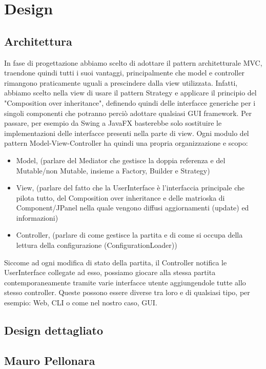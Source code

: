 \section{Design}
\subsection{Architettura}

In fase di progettazione abbiamo scelto di adottare il pattern architetturale MVC, traendone quindi tutti i suoi vantaggi, principalmente che model e controller rimangono praticamente uguali a prescindere dalla view utilizzata. Infatti, abbiamo scelto nella view di usare il pattern Strategy e applicare il principio del "Composition over inheritance", definendo quindi delle interfacce generiche per i singoli componenti che potranno perciò adottare qualsiasi GUI framework. Per passare, per esempio da Swing a JavaFX basterebbe solo sostituire le implementazioni delle interfacce presenti nella parte di view. Ogni modulo del pattern Model-View-Controller ha quindi una propria organizzazione e scopo:
\begin{itemize}
    \item Model, (parlare del Mediator che gestisce la doppia referenza e del Mutable/non Mutable, insieme a Factory, Builder e Strategy)
    \item View, (parlare del fatto che la UserInterface è l'interfaccia principale che pilota tutto, del Composition over inheritance e delle matrioska di Component/JPanel nella quale vengono diffusi aggiornamenti (update) ed informazioni)
    \item Controller, (parlare di come gestisce la partita e di come si occupa della lettura della configurazione (ConfigurationLoader))
\end{itemize}
Siccome ad ogni modifica di stato della partita, il Controller notifica le UserInterface collegate ad esso, possiamo giocare alla stessa partita contemporaneamente tramite varie interfacce utente aggiungendole tutte allo stesso controller. Queste possono essere diverse tra loro e di qualsiasi tipo, per esempio: Web, CLI o come nel nostro caso, GUI.

\subsection{Design dettagliato}

\subsection*{Mauro Pellonara}

